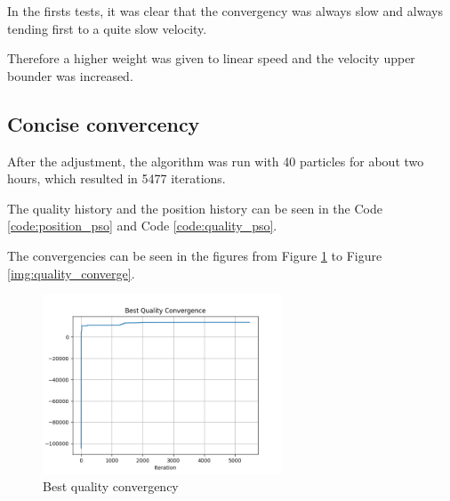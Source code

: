 

In the firsts tests, it was clear that the convergency was always slow and always tending first to a quite slow velocity.

Therefore a higher weight was given to linear speed and the velocity upper bounder was increased.

\subsection{Concise convercency}

After the adjustment, the algorithm was run with 40 particles for about two hours, which resulted in 5477 iterations.

The quality history and the position history can be seen in the Code \ref{code:position_pso} and Code \ref{code:quality_pso}.

The convergencies can be seen in the figures from Figure \ref{img:best_quality_converge} to Figure \ref{img:quality_converge}.





\begin{figure}
  \begin{center}
  \includegraphics[width=2.8in]{./../code/results/line_best_convergence.png}
  \caption{Best quality convergency}
  \label{img:best_quality_converge}
  \end{center}
\end{figure}

